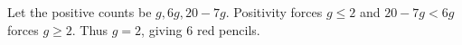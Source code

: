 Let the positive counts be $g,6g,20-7g$. Positivity forces $g\le2$ and $20-7g<6g$ forces $g\ge2$. Thus $g=2$, giving $\boxed6$ red pencils.

